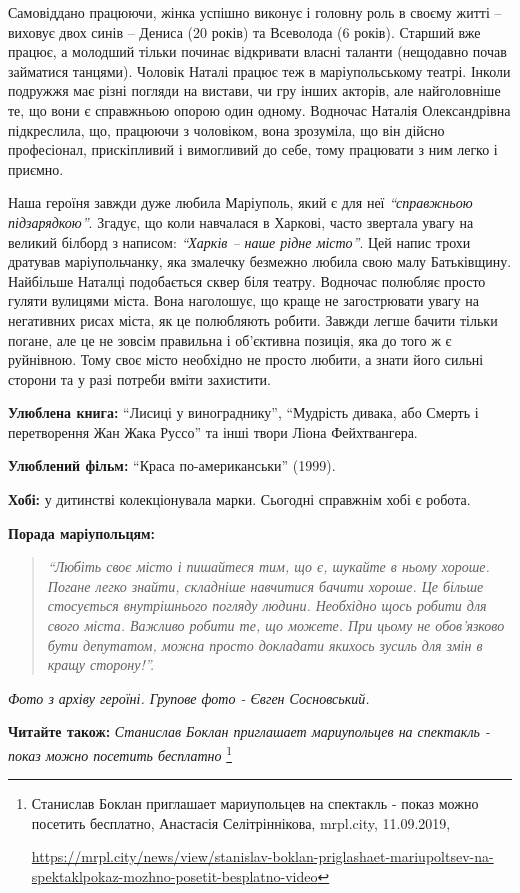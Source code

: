 
Самовіддано працюючи, жінка успішно виконує і головну роль в своєму житті –
виховує двох синів – Дениса (20 років) та Всеволода (6 років). Старший вже
працює, а молодший тільки починає відкривати власні таланти (нещодавно почав
займатися танцями). Чоловік Наталі працює теж в маріупольському театрі. Інколи
подружжя має різні погляди на вистави, чи гру інших акторів, але найголовніше
те, що вони є справжньою опорою один одному. Водночас Наталія Олександрівна
підкреслила, що, працюючи з чоловіком, вона зрозуміла, що він дійсно
професіонал, прискіпливий і вимогливий до себе, тому працювати з ним легко і
приємно. 


Наша героїня завжди дуже любила Маріуполь, який є для неї \emph{\enquote{справжньою
підзарядкою}}. Згадує, що коли навчалася в Харкові, часто звертала увагу на
великий білборд з написом: \emph{\enquote{Харків – наше рідне місто}}. Цей напис трохи
дратував маріупольчанку, яка змалечку безмежно любила свою малу Батьківщину.
Найбільше Наталці подобається сквер біля театру. Водночас полюбляє просто
гуляти вулицями міста. Вона наголошує, що краще не загострювати увагу на
негативних рисах міста, як це полюбляють робити. Завжди легше бачити тільки
погане, але це не зовсім правильна і об'єктивна позиція, яка до того ж є
руйнівною. Тому своє місто необхідно не просто любити, а знати його сильні
сторони та у разі потреби вміти захистити. 

\textbf{Улюблена книга:} \enquote{Лисиці у винограднику}, \enquote{Мудрість дивака, або Смерть і перетворення Жан Жака Руссо} та інші твори Ліона Фейхтвангера.

\textbf{Улюблений фільм:} \enquote{Краса по-американськи} (1999).

\textbf{Хобі:} у дитинстві колекціонувала марки. Сьогодні справжнім хобі є робота.

\textbf{Порада маріупольцям:} 

\begin{quote}
\em\enquote{Любіть своє місто і пишайтеся тим, що є, шукайте в ньому хороше. Погане легко
знайти, складніше навчитися бачити хороше. Це більше стосується внутрішнього
погляду людини. Необхідно щось робити для свого міста. Важливо робити те, що
можете. При цьому не обов'язково бути депутатом, можна просто докладати якихось
зусиль для змін в кращу сторону!}. 
\end{quote}

\emph{Фото з архіву героїні. Групове фото - Євген Сосновський.}

\textbf{Читайте також:} \emph{Станислав Боклан приглашает мариупольцев на спектакль - показ можно посетить бесплатно}%
\footnote{Станислав Боклан приглашает мариупольцев на спектакль - показ можно посетить бесплатно, Анастасія Селітріннікова, %
mrpl.city, 11.09.2019, \par%
\url{https://mrpl.city/news/view/stanislav-boklan-priglashaet-mariupoltsev-na-spektaklpokaz-mozhno-posetit-besplatno-video}
}
